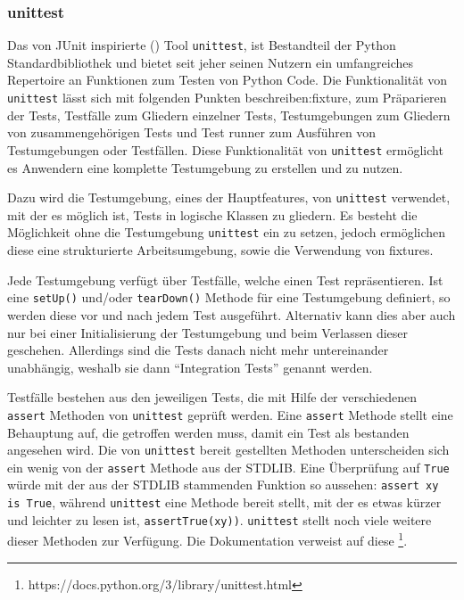 \subsubsection{unittest}\label{python-tools:unittest}

Das von JUnit inspirierte (\cite{docs.python:unittest}) Tool
\lstinline{unittest}, ist Bestandteil der Python Standardbibliothek und bietet
seit jeher seinen Nutzern ein umfangreiches Repertoire an Funktionen zum Testen
von Python Code.
\noindent
Die Funktionalität von \lstinline{unittest} lässt sich mit folgenden Punkten
beschreiben:\Gls{fixture}, zum Präparieren der Tests, Testfälle zum Gliedern
einzelner Tests, Testumgebungen zum Gliedern von zusammengehörigen Tests und
Test runner zum Ausführen von Testumgebungen oder Testfällen.
Diese Funktionalität von \lstinline{unittest} ermöglicht es Anwendern eine
komplette Testumgebung zu erstellen und zu nutzen.

Dazu wird die Testumgebung, eines der Hauptfeatures, von \lstinline{unittest}
verwendet, mit der es möglich ist, Tests in logische Klassen zu gliedern. Es
besteht die Möglichkeit ohne die Testumgebung \lstinline{unittest} ein zu
setzen, jedoch ermöglichen diese eine strukturierte Arbeitsumgebung, sowie die
Verwendung von \Glspl{fixture}.

Jede Testumgebung verfügt über Testfälle, welche einen Test repräsentieren.
Ist eine \lstinline{setUp()} und/oder \lstinline{tearDown()} Methode für eine
Testumgebung definiert, so werden diese vor und nach jedem Test ausgeführt.
Alternativ kann dies aber auch nur bei einer Initialisierung der Testumgebung
und beim Verlassen dieser geschehen. Allerdings sind die Tests danach nicht
mehr untereinander unabhängig, weshalb sie dann "`Integration Tests"' genannt
werden.

Testfälle bestehen aus den jeweiligen Tests, die mit Hilfe der verschiedenen
\lstinline{assert} Methoden von \lstinline{unittest} geprüft werden. Eine
\lstinline{assert} Methode stellt eine Behauptung auf, die getroffen werden
muss, damit ein Test als bestanden angesehen wird. Die von \lstinline{unittest}
bereit gestellten Methoden unterscheiden sich ein wenig von der
\lstinline{assert} Methode aus der STDLIB. Eine Überprüfung auf
\lstinline{True} würde mit der aus der STDLIB stammenden Funktion so aussehen:
\lstinline{assert xy is True}, während \lstinline{unittest} eine Methode bereit
stellt, mit der es etwas kürzer und leichter zu lesen ist,
\lstinline{assertTrue(xy))}. \lstinline{unittest} stellt noch viele weitere
dieser Methoden zur Verfügung. Die Dokumentation verweist auf diese
\footnote{https://docs.python.org/3/library/unittest.html}.

